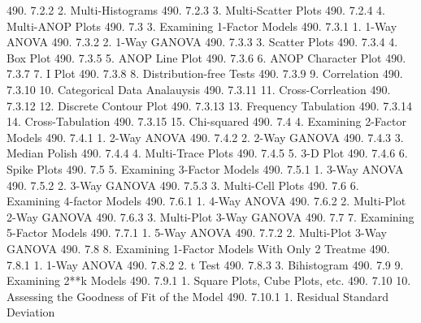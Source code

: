 490.      7.2.2                       2. Multi-Histograms
490.      7.2.3                       3. Multi-Scatter Plots
490.      7.2.4                       4. Multi-ANOP Plots
490.      7.3                   3. Examining 1-Factor Models
490.      7.3.1                       1. 1-Way ANOVA
490.      7.3.2                       2. 1-Way GANOVA
490.      7.3.3                       3. Scatter Plots
490.      7.3.4                       4. Box Plot
490.      7.3.5                       5. ANOP Line Plot
490.      7.3.6                       6. ANOP Character Plot
490.      7.3.7                       7. I Plot
490.      7.3.8                       8. Distribution-free Tests
490.      7.3.9                       9. Correlation
490.      7.3.10                     10. Categorical Data Analauysis
490.      7.3.11                     11. Cross-Corrleation
490.      7.3.12                     12. Discrete Contour Plot
490.      7.3.13                     13. Frequency Tabulation
490.      7.3.14                     14. Cross-Tabulation
490.      7.3.15                     15. Chi-squared
490.      7.4                   4. Examining 2-Factor Models
490.      7.4.1                       1. 2-Way ANOVA
490.      7.4.2                       2. 2-Way GANOVA
490.      7.4.3                       3. Median Polish
490.      7.4.4                       4. Multi-Trace Plots
490.      7.4.5                       5. 3-D Plot
490.      7.4.6                       6. Spike Plots
490.      7.5                   5. Examining 3-Factor Models
490.      7.5.1                       1. 3-Way ANOVA
490.      7.5.2                       2. 3-Way GANOVA
490.      7.5.3                       3. Multi-Cell Plots
490.      7.6                   6. Examining 4-factor Models
490.      7.6.1                       1. 4-Way ANOVA
490.      7.6.2                       2. Multi-Plot 2-Way GANOVA
490.      7.6.3                       3. Multi-Plot 3-Way GANOVA
490.      7.7                   7. Examining 5-Factor Models
490.      7.7.1                       1. 5-Way ANOVA
490.      7.7.2                       2. Multi-Plot 3-Way GANOVA
490.      7.8                   8. Examining 1-Factor Models With Only 2 Treatme
490.      7.8.1                       1. 1-Way ANOVA
490.      7.8.2                       2. t Test
490.      7.8.3                       3. Bihistogram
490.      7.9                   9. Examining 2**k Models
490.      7.9.1                       1. Square Plots, Cube Plots, etc.
490.      7.10                 10. Assessing the Goodness of Fit of the Model
490.      7.10.1                      1. Residual Standard Deviation
